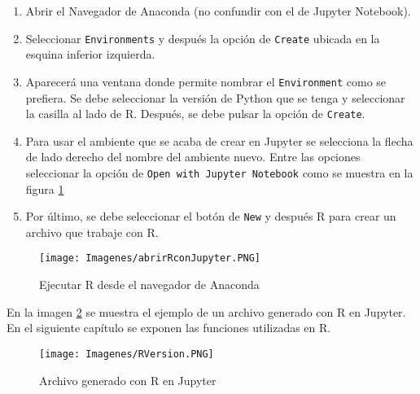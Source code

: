\begin{enumerate}
	\item Abrir el Navegador de \textsf{Anaconda} (no confundir con el de \textsf{Jupyter Notebook}).
	
	\item Seleccionar \texttt{Environments} y después la opción de \texttt{Create} ubicada en la esquina inferior izquierda. 
	
	\item Aparecerá una ventana donde permite nombrar el \texttt{Environment} como se prefiera. Se debe seleccionar la versión de \textsf{Python} que se tenga y seleccionar la casilla al lado de \textsf{R}. Después, se debe pulsar la opción de \texttt{Create}. 
	
	\item Para usar el ambiente que se acaba de crear en \textsf{Jupyter} se selecciona la flecha de lado derecho del nombre del ambiente nuevo. Entre las opciones seleccionar la opción de \texttt{Open with Jupyter Notebook} como se muestra en la figura \ref{abrirRconJupyter}
	
	\item Por último, se debe seleccionar el botón de \texttt{New} y después \textsf{R} para crear un archivo que trabaje con \textsf{R}. 
\end{enumerate}

\begin{figure}[h]
	\begin{center}
		\texttt{[image: Imagenes/abrirRconJupyter.PNG]}
		\caption{Ejecutar R desde el navegador de Anaconda}
		\label{abrirRconJupyter}
	\end{center}
\end{figure}

En la imagen \ref{rVersion} se muestra el ejemplo de un archivo generado con \textsf{R} en \textsf{Jupyter}. En el siguiente capítulo se exponen las funciones utilizadas en \textsf{R}. 

\begin{figure}[h]
	\begin{center}
		\texttt{[image: Imagenes/RVersion.PNG]}
		\caption{Archivo generado con R en Jupyter}
		\label{rVersion}
	\end{center}
\end{figure}


